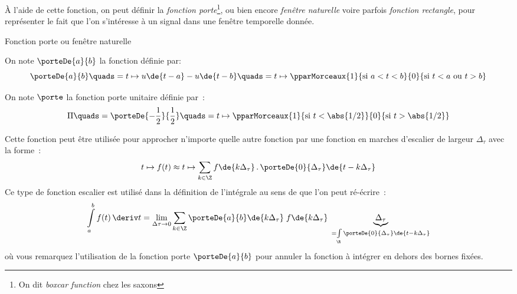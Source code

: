       À l'aide de cette fonction, on peut définir la \emph{fonction
        porte}\footnote{On dit \emph{boxcar function} chez les saxons}, ou bien
      encore \emph{fenêtre naturelle} voire parfois \emph{fonction
        rectangle}, pour représenter le fait que l'on s'intéresse à un
      signal dans une fenêtre temporelle donnée.
        
      \begin{definition}{Fonction porte ou fenêtre naturelle}

        On note $\porteDe{a}{b}$ la fonction définie par:
        \begin{equation}
          \label{eq:porte}
          \porteDe{a}{b} \quads= t \mapsto u\de{t-a}-u\de{t-b} \quads= t\mapsto \pparMorceaux{1}{\text{si } a<t<b}{0}{\text{si } t<a \text{ ou } t>b} 
        \end{equation}

        On note $\porte$ la fonction porte unitaire définie par~:
\begin{equation}
          \label{eq:porte_unitaire}
          \Pi \quads= \porteDe{-\frac{1}{2}}{\frac{1}{2}} \quads= t\mapsto \pparMorceaux{1}{\text{si } t<\abs{1/2}}{0}{\text{si } t>\abs{1/2}} 
        \end{equation}   
      \end{definition}

      Cette fonction peut être utilisée pour approcher n'importe
      quelle autre fonction par une fonction en marches d'escalier de largeur $\Delta_\tau$ avec la forme~:
      \begin{equation}
        \label{eq:escalier}
        t\mapsto f(t)  \approx t\mapsto \sum_{k\in\Z} f\de{k\Delta_\tau}\,.\,\porteDe{0}{\Delta_\tau}\de{t-k\Delta_\tau}
      \end{equation}
      Ce type de fonction escalier est utilisé dans la définition de
      l'intégrale au sens de  que l'on peut
      ré-écrire~:
      \begin{equation}
        \label{eq:integrale_escalier}
        \int\limits_{a}^{b}f(t)\,\deriv t = \lim_{\Delta\tau \to 0} \sum_{k\in\Z} \porteDe{a}{b}\de{k\Delta_\tau} \; f\de{k\Delta_\tau}\;\underbrace{\Delta_\tau}_{=\int\limits_\R\porteDe{0}{\Delta_\tau}\de{t-k\Delta_\tau}}
      \end{equation}
      où vous remarquez l'utilisation de la fonction porte $\porteDe{a}{b}$ pour annuler la fonction à intégrer en dehors des bornes fixées.

